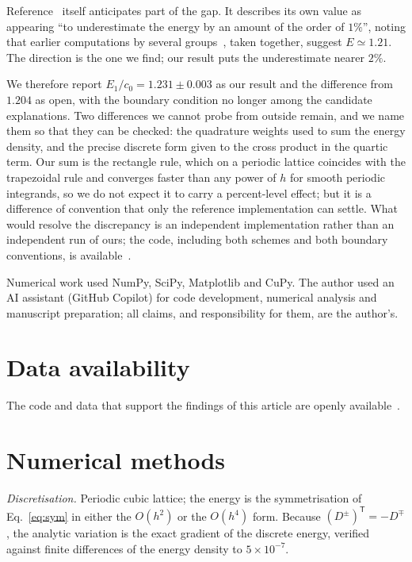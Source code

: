 \documentclass[aps,prd,preprint,nofootinbib,longbibliography]{revtex4-2}
\begin{document}
Reference~\cite{sutcliffe2007} itself anticipates part of the gap. It describes
its own value as appearing ``to underestimate the energy by an amount of the
order of $1\%$'', noting that earlier computations by several
groups~\cite{gladikowski1997,faddeev1997,battye1998,hietarinta1999}, taken
together, suggest $E\simeq1.21$. The direction is the one we find; our result
puts the underestimate nearer $2\%$.

We therefore report $E_1/c_0=1.231\pm0.003$ as our result and the difference from
$1.204$ as open, with the boundary condition no longer among the candidate
explanations. Two differences we cannot probe from outside remain, and we name
them so that they can be checked: the quadrature weights used to sum the energy
density, and the precise discrete form given to the cross product in the quartic
term. Our sum is the rectangle rule, which on a periodic lattice coincides with
the trapezoidal rule and converges faster than any power of $h$ for smooth
periodic integrands, so we do not expect it to carry a percent-level effect; but
it is a difference of convention that only the reference implementation can
settle. What would resolve the discrepancy is an independent implementation
rather than an independent run of ours; the code, including both schemes and both
boundary conventions, is available~\cite{repo}.

\begin{acknowledgments}
Numerical work used NumPy, SciPy, Matplotlib and CuPy. The author used an
AI assistant (GitHub Copilot) for code development, numerical analysis and
manuscript preparation; all claims, and responsibility for them, are the
author's.
\end{acknowledgments}

\section*{Data availability}

The code and data that support the findings of this article are openly
available~\cite{repo}.

\appendix

\section{Numerical methods}

\emph{Discretisation.} Periodic cubic lattice; the energy is the symmetrisation
of Eq.~\eqref{eq:sym} in either the $O(h^2)$ or the $O(h^4)$ form. Because
$(D^\pm)^{\mathsf T}=-D^\mp$, the analytic variation is the exact gradient of the
discrete energy, verified against finite differences of the energy density to
$5\times10^{-7}$.
\end{document}
